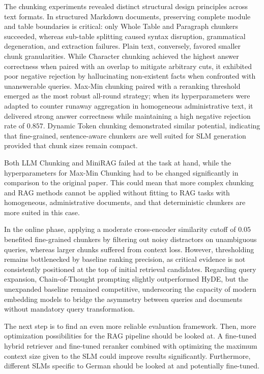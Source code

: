 \documentclass[12pt]{article} %
\begin{document}
The chunking experiments revealed distinct structural design principles across text formats. In structured Markdown documents, preserving complete module and table boundaries is critical: only Whole Table and Paragraph chunkers succeeded, whereas sub-table splitting caused syntax disruption, grammatical degeneration, and extraction failures. Plain text, conversely, favored smaller chunk granularities. While Character chunking achieved the highest answer correctness when paired with an overlap to mitigate arbitrary cuts, it exhibited poor negative rejection by hallucinating non-existent facts when confronted with unanswerable queries. Max-Min chunking paired with a reranking threshold emerged as the most robust all-round strategy; when its hyperparameters were adapted to counter runaway aggregation in homogeneous administrative text, it delivered strong answer correctness while maintaining a high negative rejection rate of $0.857$. Dynamic Token chunking demonstrated similar potential, indicating that fine-grained, sentence-aware chunkers are well suited for SLM generation provided that chunk sizes remain compact.

Both LLM Chunking and MiniRAG failed at the task at hand, while the hyperparameters for Max-Min Chunking had to be changed significantly in comparison to the original paper. This could mean that more complex chunking and RAG methods cannot be applied without fitting to RAG tasks with homogeneous, administrative documents, and that deterministic chunkers are more suited in this case.

In the online phase, applying a moderate cross-encoder similarity cutoff of $0.05$ benefited fine-grained chunkers by filtering out noisy distractors on unambiguous queries, whereas larger chunks suffered from context loss. However, thresholding remains bottlenecked by baseline ranking precision, as critical evidence is not consistently positioned at the top of initial retrieval candidates. Regarding query expansion, Chain-of-Thought prompting slightly outperformed HyDE, but the unexpanded baseline remained competitive, underscoring the capacity of modern embedding models to bridge the asymmetry between queries and documents without mandatory query transformation.

The next step is to find an even more reliable evaluation framework. Then, more optimization possibilities for the RAG pipeline should be looked at. A fine-tuned hybrid retriever and fine-tuned reranker combined with optimizing the maximum context size given to the SLM could improve results significantly. Furthermore, different SLMs specific to German should be looked at and potentially fine-tuned.
\end{document}
